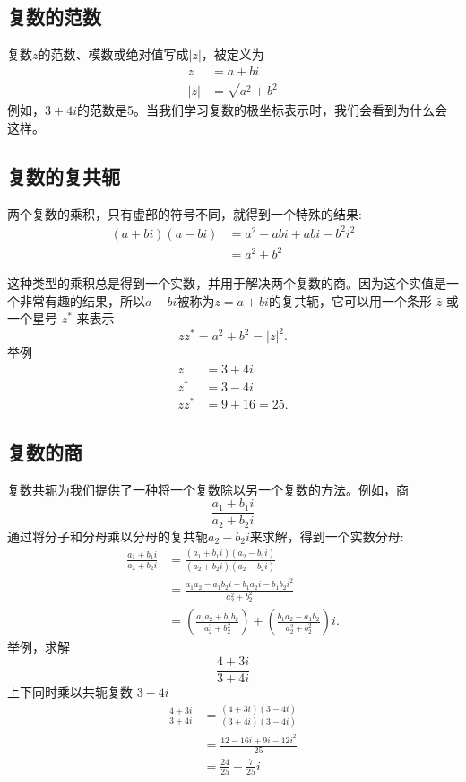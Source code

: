 \subsection{复数的范数}
复数$z$的范数、模数或绝对值写成$|z|$，被定义为
$$
  \begin{aligned}
    z   & =a+b i              \\
    |z| & =\sqrt{a^{2}+b^{2}}
  \end{aligned}
$$
例如，$3+ 4i $的范数是5。当我们学习复数的极坐标表示时，我们会看到为什么会这样。

\subsection{复数的复共轭}
两个复数的乘积，只有虚部的符号不同，就得到一个特殊的结果:
$$
  \begin{aligned}
    (a+b i)(a-b i) & =a^{2}-a b i+a b i-b^{2} i^{2} \\
                   & =a^{2}+b^{2}
  \end{aligned}
$$

这种类型的乘积总是得到一个实数，并用于解决两个复数的商。因为这个实值是一个非常有趣的结果，所以$a-b i$被称为$z=a+b i$的复共轭，它可以用一个条形 $\bar{z}$ 或一个星号 $z^{*}$ 来表示
$$
  z z^{*}=a^{2}+b^{2}=|z|^{2} .
$$
举例
$$
  \begin{aligned}
    z       & =3+4 i     \\
    z^{*}   & =3-4 i     \\
    z z^{*} & =9+16=25 .
  \end{aligned}
$$

\subsection{复数的商}
复数共轭为我们提供了一种将一个复数除以另一个复数的方法。例如，商
$$
  \frac{a_{1}+b_{1} i}{a_{2}+b_{2} i}
$$
通过将分子和分母乘以分母的复共轭$a_{2}-b_{2} i$来求解，得到一个实数分母:
$$
  \begin{aligned}
    \frac{a_{1}+b_{1} i}{a_{2}+b_{2} i} & =\frac{\left(a_{1}+b_{1} i\right)\left(a_{2}-b_{2} i\right)}{\left(a_{2}+b_{2} i\right)\left(a_{2}-b_{2} i\right)}                     \\
                                        & =\frac{a_{1} a_{2}-a_{1} b_{2} i+b_{1} a_{2} i-b_{1} b_{2} i^{2}}{a_{2}^{2}+b_{2}^{2}}                                                 \\
                                        & =\left(\frac{a_{1} a_{2}+b_{1} b_{2}}{a_{2}^{2}+b_{2}^{2}}\right)+\left(\frac{b_{1} a_{2}-a_{1} b_{2}}{a_{2}^{2}+b_{2}^{2}}\right) i .
  \end{aligned}
$$
举例，求解
$$
  \frac{4+3 i}{3+4 i}
$$
上下同时乘以共轭复数 $3-4i$
$$
  \begin{aligned}
    \frac{4+3 i}{3+4 i} & =\frac{(4+3 i)(3-4 i)}{(3+4 i)(3-4 i)} \\
                        & =\frac{12-16 i+9 i-12 i^{2}}{25}       \\
                        & =\frac{24}{25}-\frac{7}{25} i
  \end{aligned}
$$

